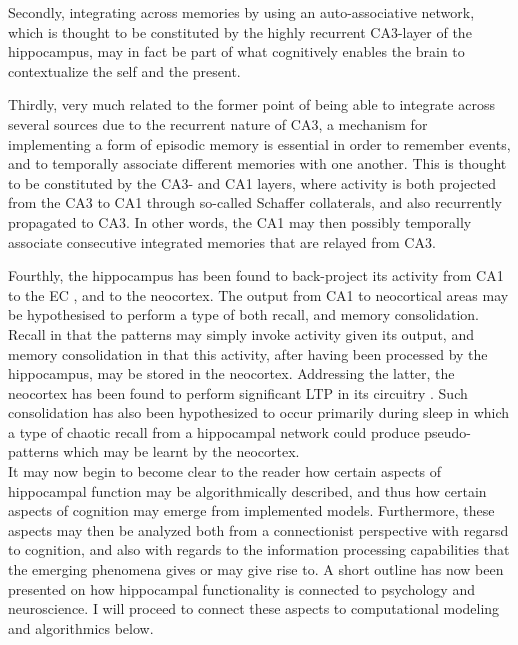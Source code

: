 Secondly, integrating across memories by using an auto-associative network, which is thought to be constituted by the highly recurrent CA3-layer of the hippocampus, may in fact be part of what cognitively enables the brain to contextualize the self and the present.

Thirdly, very much related to the former point of being able to integrate across several sources due to the recurrent nature of CA3, a mechanism for implementing a form of episodic memory is essential in order to remember events, and to temporally associate different memories with one another. This is thought to be constituted by the CA3- and CA1 layers, where activity is both projected from the CA3 to CA1 through so-called Schaffer collaterals, and also recurrently propagated to CA3. In other words, the CA1 may then possibly temporally associate consecutive integrated memories that are relayed from CA3.

Fourthly, the hippocampus has been found to back-project its activity from CA1 to the EC \citep{Rolls1998chpt6}, and to the neocortex. The output from CA1 to neocortical areas may be hypothesised to perform a type of both recall, and memory consolidation. Recall in that the patterns may simply invoke activity given its output, and memory consolidation in that this activity, after having been processed by the hippocampus, may be stored in the neocortex. Addressing the latter, the neocortex has been found to perform significant LTP in its circuitry \citep{Rolls1998chpt6}. Such consolidation has also been hypothesized to occur primarily during sleep \citep{French2001} in which a type of chaotic recall from a hippocampal network could produce pseudo-patterns which may be learnt by the neocortex.
\\


It may now begin to become clear to the reader how certain aspects of hippocampal function may be algorithmically described, and thus how certain aspects of cognition may emerge from implemented models. Furthermore, these aspects may then be analyzed both from a connectionist perspective with regarsd to cognition, and also with regards to the information processing capabilities that the emerging phenomena gives or may give rise to. A short outline has now been presented on how hippocampal functionality is connected to psychology and neuroscience. I will proceed to connect these aspects to computational modeling and algorithmics below.

